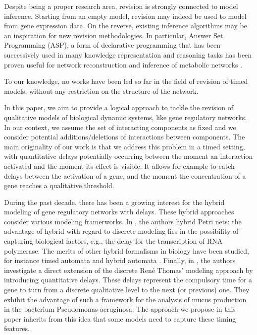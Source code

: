 Despite being a proper research area, revision is strongly connected to model inference. Starting from an empty model, revision may indeed be used to model from gene expression data. On the reverse, existing inference algorithms may be an inspiration for new revision methodologies. In particular, Answer Set Programming (ASP), a form of declarative programming that has been successively used in many knowledge representation and reasoning tasks \cite{DBLP:journals/amai/Niemela99,Baral03,DBLP:conf/iclp/Baral08} has been proven useful for network reconstruction \cite{durzinsky2011automatic} and inference of metabolic networks \cite{videla2014learning}. 

To our knowledge, no works have been led so far in the field of revision of timed models, without any restriction on the structure of the network. 

In this paper, we aim to provide a logical approach to tackle the revision of qualitative models of biological dynamic systems, like gene regulatory networks. In our context, we assume the set of interacting components as fixed and we consider potential additions/deletions of interactions between components. The main originality of our work is that we address this problem in a timed setting, with quantitative delays potentially occurring between the moment an interaction activated and the moment its effect is visible. It allows for example to catch delays between the activation of a gene, and the moment the concentration of a gene reaches a qualitative threshold. 

During the past decade, there has been a growing interest for the hybrid modeling of gene regulatory networks with delays. These hybrid approaches consider various modeling framerworks. In \cite{matsuno2000hybrid}, the authors hybrid Petri nets: the advantage of hybrid with regard to discrete modeling lies in the possibility of capturing biological factors, e.g., the delay for the transcription of RNA polymerase. The merits of other hybrid formalisms in biology have been studied, for instance timed automata \cite{siebert2008temporal} and hybrid automata \cite{ahmad2006hybrid}. 
Finally, in \cite{comet2010formal}, the authors investigate a direct extension of the discrete Ren\'e Thomas' modeling approach by introducing quantitative delays. These delays represent the compulsory time for a gene to turn from a discrete qualitative level to the next (or previous) one. They exhibit the advantage of such a framework for the analysis of mucus production in the bacterium Pseudomonas aeruginosa. The approach we propose in this paper inherits from this idea that some models need to capture these timing features. 

